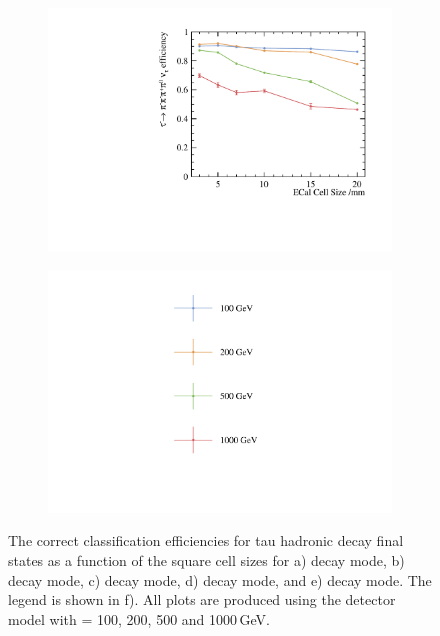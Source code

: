 \begin{figure}[htbp]
\begin{subfigure}[b]{0.45\textwidth}
  \includegraphics[width=\textwidth]{tau/plots3/decayMode6.pdf}
  \caption{}
  \label{fig:tauDecayMode6}
\end{subfigure}
\begin{subfigure}[b]{0.45\textwidth}
  \includegraphics[width=\textwidth]{tau/plots3/legend.pdf}
  \caption{}
  \label{fig:tauDecayLegend}
\end{subfigure}
\caption[The correct classification efficiency for  tau hadronic decay final states  as a function of the \ECAL square cell sizes]
{ The correct classification efficiencies for  tau hadronic decay final states  as a function of the \ECAL square cell sizes for a) \decayPionShort decay mode, b) \decayRhoShortest decay mode, c) \decayAiPhotonShortest decay mode, d) \decayAiPionShortest decay mode, and e) \decayThreePionPhotonShort decay mode. The legend is shown in f). All plots are produced using  the \ILD detector model with \sqrtS = 100, 200, 500 and 1000\,GeV.}
\label{fig:TauPionEfficiency}
\end{figure}


